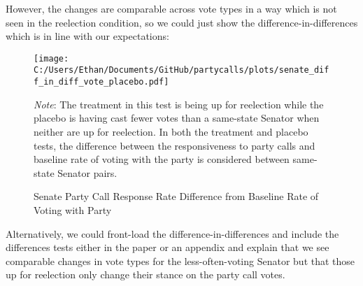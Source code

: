 \documentclass[12pt]{article}
\newcommand\fnote[1]{\captionsetup{font=small}\caption*{#1}}
\begin{document}
However, the changes are comparable across vote types in a way which is not seen in the reelection condition, so we could just show the difference-in-differences which is in line with our expectations:

\begin{figure}[H]
	\centering
	\caption{Senate Party Call Response Rate Difference from Baseline Rate of Voting with Party}
	\texttt{[image: C:/Users/Ethan/Documents/GitHub/partycalls/plots/senate\_diff\_in\_diff\_vote\_placebo.pdf]}
	\fnote{\textit{Note}: The treatment in this test is being up for reelection while the placebo is having cast fewer votes than a same-state Senator when neither are up for reelection. In both the treatment and placebo tests, the difference between the responsiveness to party calls and baseline rate of voting with the party is considered between same-state Senator pairs.}
\end{figure}

Alternatively, we could front-load the difference-in-differences and include the differences tests either in the paper or an appendix and explain that we see comparable changes in vote types for the less-often-voting Senator but that those up for reelection only change their stance on the party call votes.
\end{document}
